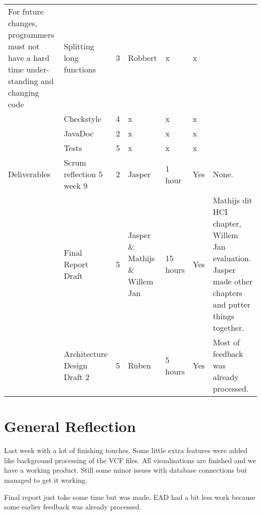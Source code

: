 \documentclass[a4paper]{report}
\begin{document}
\begin{landscape}
\begin{longtable}{p{3cm}|p{5cm}|l|l|l|l|p{7cm}}
For future changes, programmers must not have a hard time under- standing and changing code
& Splitting long functions & 3 & Robbert & x & x & \\
& Checkstyle & 4 & x & x & x & \\
& JavaDoc & 2 & x & x & x & \\
& Tests & 5 & x & x & x & \\
\hline

Deliverables
& Scrum reflection 5 week 9 & 2 & Jasper & 1 hour & Yes & None.\\
& Final Report Draft & 5 & Jasper \& Mathijs \& Willem Jan & 15 hours & Yes & Mathijs dit HCI chapter, Willem Jan evaluation. Jasper made other chapters and putter things together. \\
& Architecture Design Draft 2 & 5 & Ruben & 5 hours & Yes & Most of feedback was already processed. \\
\hline
\end{longtable}
\end{landscape}

\section*{General Reflection}
Last week with a lot of finishing touches. Some little extra features were added like background processing of the VCF files. All visualisations are finished and we have a working product. Still some minor issues with database connections but managed to get it working.

Final report just toke some time but was made. EAD had a bit less work because some earlier feedback was already processed. \\
\end{document}
